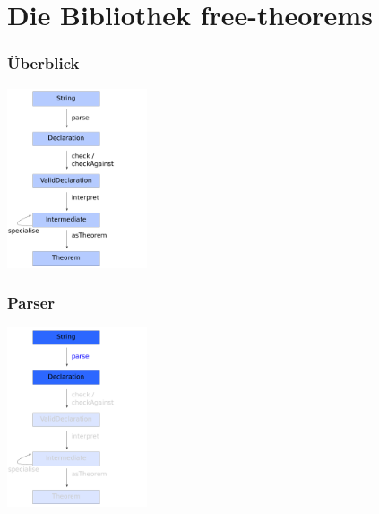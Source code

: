 \documentclass{beamer}
\begin{document}
\section{Die Bibliothek free-theorems}

\begin{frame}
\frametitle{Überblick}
\begin{center}
\includegraphics[height=200px]{overview-free-theorems}
\end{center}
\end{frame}


\begin{frame}
\frametitle{Parser}
\begin{center}
\includegraphics[height=200px]{overview-free-theorems-parse}
\end{center}
\end{frame}

\end{document}
